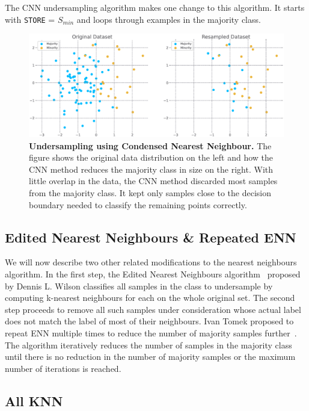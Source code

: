 The CNN undersampling algorithm makes one change to this algorithm. It starts with \texttt{STORE} =
$S_{min}$ and loops through examples in the majority class.

\begin{figure}
    \centering
    \includegraphics[width=\linewidth]{figures/cnn.eps}
    \caption{
        \textbf{Undersampling using Condensed Nearest Neighbour.} The figure shows the original
        data distribution on the left and how the CNN method reduces the majority class in size on
        the right. With little overlap in the data, the CNN method discarded most samples from the
        majority class. It kept only samples close to the decision boundary needed to classify the
        remaining points correctly.
    }
    \label{figure:cnn}
\end{figure}


\subsection{Edited Nearest Neighbours \& Repeated ENN}
\label{subsection:enn}

We will now describe two other related modifications to the nearest neighbours algorithm. In the
first step, the Edited Nearest Neighbours algorithm~\cite{enn} proposed by Dennis L. Wilson
classifies all samples in the class to undersample by computing k-nearest neighbours for each on
the whole original set. The second step proceeds to remove all such samples under consideration
whose actual label does not match the label of most of their neighbours. Ivan Tomek proposed to
repeat ENN multiple times to reduce the number of majority samples further~\cite{repeated-enn}. The
algorithm iteratively reduces the number of samples in the majority class until there is no
reduction in the number of majority samples or the maximum number of iterations is reached.


\subsection{All KNN}
\label{subsection:allknn}

